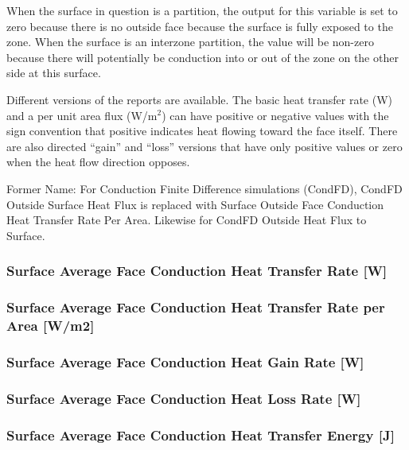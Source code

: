 When the surface in question is a partition, the output for this variable is set to zero because there is no outside face because the surface is fully exposed to the zone.  When the surface is an interzone partition, the value will be non-zero because there will potentially be conduction into or out of the zone on the other side at this surface.

Different versions of the reports are available. The basic heat transfer rate (W) and a per unit area flux (W/m\(^{2}\)) can have positive or negative values with the sign convention that positive indicates heat flowing toward the face itself. There are also directed ``gain'' and ``loss'' versions that have only positive values or zero when the heat flow direction opposes.

Former Name: For Conduction Finite Difference simulations (CondFD), CondFD Outside Surface Heat Flux is replaced with Surface Outside Face Conduction Heat Transfer Rate Per Area. Likewise for CondFD Outside Heat Flux to Surface.

\subsubsection{Surface Average Face Conduction Heat Transfer Rate {[}W{]}}\label{surface-average-face-conduction-heat-transfer-rate-w}

\subsubsection{Surface Average Face Conduction Heat Transfer Rate per Area {[}W/m2{]}}\label{surface-average-face-conduction-heat-transfer-rate-per-area-wm2}

\subsubsection{Surface Average Face Conduction Heat Gain Rate {[}W{]}}\label{surface-average-face-conduction-heat-gain-rate-w}

\subsubsection{Surface Average Face Conduction Heat Loss Rate {[}W{]}}\label{surface-average-face-conduction-heat-loss-rate-w}

\subsubsection{Surface Average Face Conduction Heat Transfer Energy {[}J{]}}\label{surface-average-face-conduction-heat-transfer-energy-j}

